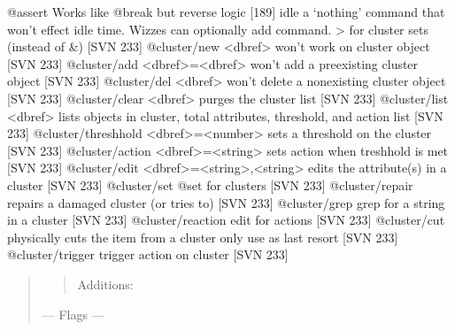 \documentclass[letterpaper,10pt,english]{sphinxmanual}
\begin{document}
\sphinxAtStartPar
@assert \sphinxhyphen{} Works like @break but reverse logic {[}18\sphinxhyphen{}9{]}
idle \sphinxhyphen{} a ‘nothing’ command that won’t effect idle time.  Wizzes can optionally add command.
\textgreater{} for cluster sets (instead of \&) {[}SVN 233{]}
@cluster/new \textless{}dbref\textgreater{}                    \textendash{} won’t work on cluster object {[}SVN 233{]}
@cluster/add \textless{}dbref\textgreater{}=\textless{}dbref\textgreater{}            \textendash{} won’t add a pre\sphinxhyphen{}existing cluster object {[}SVN 233{]}
@cluster/del \textless{}dbref\textgreater{}                    \textendash{} won’t delete a non\sphinxhyphen{}existing cluster object {[}SVN 233{]}
@cluster/clear \textless{}dbref\textgreater{}                  \textendash{} purges the cluster list {[}SVN 233{]}
@cluster/list \textless{}dbref\textgreater{}                   \textendash{} lists objects in cluster, total attributes, threshold, and action list {[}SVN 233{]}
@cluster/threshhold \textless{}dbref\textgreater{}=\textless{}number\textgreater{}    \textendash{} sets a threshold on the cluster {[}SVN 233{]}
@cluster/action \textless{}dbref\textgreater{}=\textless{}string\textgreater{}        \textendash{} sets action when treshhold is met {[}SVN 233{]}
@cluster/edit \textless{}dbref\textgreater{}=\textless{}string\textgreater{},\textless{}string\textgreater{} \textendash{} edits the attribute(s) in a cluster {[}SVN 233{]}
@cluster/set                            \textendash{} @set for clusters {[}SVN 233{]}
@cluster/repair                         \textendash{} repairs a damaged cluster (or tries to) {[}SVN 233{]}
@cluster/grep                           \textendash{} grep for a string in a cluster {[}SVN 233{]}
@cluster/reaction                       \textendash{} edit for actions {[}SVN 233{]}
@cluster/cut                            \textendash{} physically cuts the item from a cluster \sphinxhyphen{} only use as last resort {[}SVN 233{]}
@cluster/trigger                        \textendash{} trigger action on cluster {[}SVN 233{]}
\begin{quote}
\begin{quote}

\sphinxAtStartPar
Additions:
\end{quote}

\sphinxAtStartPar
— Flags —
\end{quote}
\end{document}
